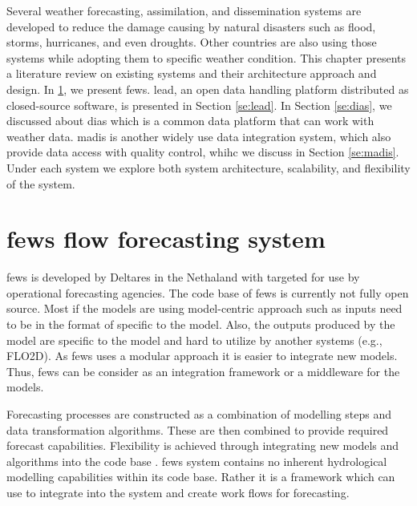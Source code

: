 Several weather forecasting, assimilation, and dissemination systems are developed to reduce the damage causing by natural disasters such as flood, storms, hurricanes, and even droughts. %
Other countries are also using those systems while adopting them %
to specific weather condition.%
This chapter presents a literature review on existing systems and their architecture approach and design. In \cref{se:fews}, we present \acrshort{fews}. \acrfull{lead}, an open data handling platform distributed as closed-source software, is presented in Section \ref{se:lead}. %
In Section \ref{se:dias}, we discussed about \acrfull{dias} which is a common data platform that can work with weather data. \acrfull{madis} is another widely use data integration system, which also provide data access with quality control, whihc we discuss in Section \ref{se:madis}.
Under each system we explore both system architecture, scalability, and flexibility of the system.



\section{\acrshort{fews} flow forecasting system}
\label{se:fews}

\acrshort{fews} \cite{Werner2013TheSystem} is developed by Deltares in the Nethaland with targeted for use by operational forecasting agencies. The code base of \acrshort{fews} is currently not fully open source.
Most if the models are using model-centric approach such as inputs need to be in the format of specific to the model. Also, the outputs produced by the model are specific to the model and hard to utilize by another systems (e.g., FLO2D). As \acrshort{fews} uses a modular approach it is easier to integrate new models. 
Thus, \acrshort{fews} can be consider as an integration framework or a middleware for the models.

Forecasting processes are constructed as a combination of modelling steps and data transformation algorithms. These are then combined to provide required forecast capabilities. Flexibility is achieved through integrating new models and algorithms into the code base \cite{Werner2013TheSystem}. \acrshort{fews} system contains no inherent hydrological modelling capabilities within its code base. Rather it is a framework which can use to integrate into the system and create work flows for forecasting.

